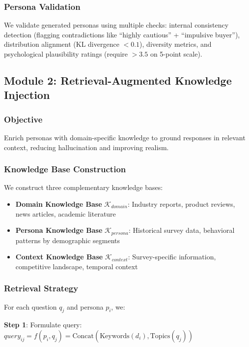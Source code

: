 \documentclass[sigconf,nonarchival]{acmart}
\begin{document}
\subsubsection{Persona Validation}

We validate generated personas using multiple checks: internal consistency detection (flagging contradictions like ``highly cautious'' + ``impulsive buyer''), distribution alignment (KL divergence $< 0.1$), diversity metrics, and psychological plausibility ratings (require $> 3.5$ on 5-point scale).

\subsection{Module 2: Retrieval-Augmented Knowledge Injection}

\subsubsection{Objective}

Enrich personas with domain-specific knowledge to ground responses in relevant context, reducing hallucination and improving realism.

\subsubsection{Knowledge Base Construction}

We construct three complementary knowledge bases:

\begin{itemize}
\item \textbf{Domain Knowledge Base} $\mathcal{K}_{domain}$: Industry reports, product reviews, news articles, academic literature
\item \textbf{Persona Knowledge Base} $\mathcal{K}_{persona}$: Historical survey data, behavioral patterns by demographic segments
\item \textbf{Context Knowledge Base} $\mathcal{K}_{context}$: Survey-specific information, competitive landscape, temporal context
\end{itemize}

\subsubsection{Retrieval Strategy}

For each question $q_j$ and persona $p_i$, we:

\textbf{Step 1}: Formulate query: $query_{ij} = f(p_i, q_j) = \text{Concat}(\text{Keywords}(d_i), \text{Topics}(q_j))$
\end{document}
